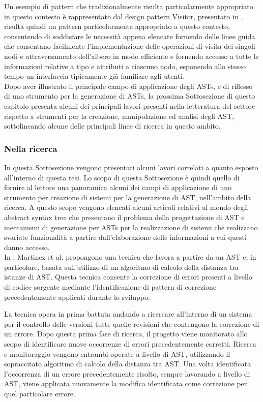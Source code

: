 Un esempio di pattern che tradizionalmente risulta particolarmente appropriato
in questo contesto è rappresentato dal design pattern Visitor, presentato in
\cite{gamma1995design}, risulta quindi un pattern particolarmente appropriato a
questo contesto, consentendo di soddisfare le necessità appena elencate fornendo
delle linee guida che consentano facilmente l’implementazione delle operazioni
di visita dei singoli nodi e attraversamento dell’albero in modo efficiente e
fornendo accesso a tutte le informazioni relative a tipo e attributi a ciascuno
nodo, esponendo allo stesso tempo un interfaccia tipicamente già familiare agli
utenti.\\

Dopo aver illustrato il principale campo di applicazione degli ASTs, e di
riflesso di uno strumento per la generazione di ASTs, la prossima Sottosezione
di questo capitolo presenta alcuni dei principali lavori presenti nella
letteratura del settore rispetto a strumenti per la creazione, manipolazione ed
analisi degli AST, sottolineando alcune delle principali linee di ricerca in
questo ambito.

\subsubsection{Nella ricerca}
\label{ast-research}

In questa Sottosezione vengono presentati alcuni lavori correlati a quanto
esposto all’interno di questa tesi. Lo scopo di questa Sottosezione è quindi
quello di fornire al lettore una panoramica alcuni dei campi di applicazione di
uno strumento per creazione di sistemi per la generazione di AST, nell'ambito
della ricerca. A questo scopo vengono elencati alcuni articoli relativi al mondo
degli abstract syntax tree che presentano il problema della progettazione di AST
e meccanismi di generazione per ASTs per la realizzazione di sistemi che
realizzano svariate funzionalità a partire dall’elaborazione delle informazioni
a cui questi danno accesso.\\

In \cite{martinez2014accurate}, Martinez et al. propongono una tecnica che
lavora a partire da un AST e, in particolare, basata sull’utilizzo di un
algoritmo di calcolo della distanza tra istanze di AST. Questa tecnica consente
la correzione di errori presenti a livello di codice sorgente mediante
l’identificazione di pattern di correzione precedentemente applicati durante lo
sviluppo.

La tecnica opera in prima battuta andando a ricercare all’interno di un sistema
per il controllo delle versioni tutte quelle revisioni che contengono la
correzione di un errore. Dopo questa prima fase di ricerca, il progetto viene
monitorato allo scopo di identificare nuove occorrenze di errori precedentemente
corretti. Ricerca e monitoraggio vengono entrambi operate a livello di AST,
utilizzando il sopraccitato algoritmo di calcolo della distanza tra AST. Una
volta identificata l’occorrenza di un errore precedentemente risolto, sempre
lavorando a livello di AST, viene applicata nuovamente la modifica identificata
come correzione per quel particolare errore.\\

